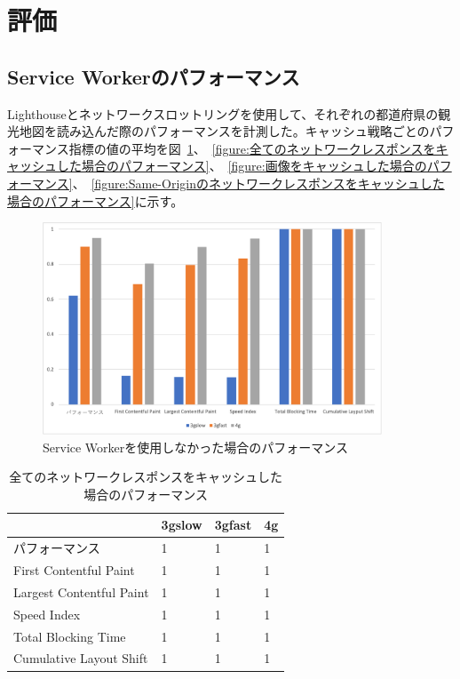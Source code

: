 \section{評価}
\label{section:評価}
\subsection{Service Workerのパフォーマンス}
\label{subsubsection:Service Workerのパフォーマンス}
Lighthouseとネットワークスロットリングを使用して、それぞれの都道府県の観光地図を読み込んだ際のパフォーマンスを計測した。キャッシュ戦略ごとのパフォーマンス指標の値の平均を図~\ref{figure:Service Workerを使用しなかった場合のパフォーマンス}、~\ref{figure:全てのネットワークレスポンスをキャッシュした場合のパフォーマンス}、~\ref{figure:画像をキャッシュした場合のパフォーマンス}、~\ref{figure:Same-Originのネットワークレスポンスをキャッシュした場合のパフォーマンス}に示す。
\begin{figure}
  \centering
  \includegraphics[width=0.9\textwidth]{images/without_service_worker.png}
  \caption{Service Workerを使用しなかった場合のパフォーマンス}\label{figure:Service Workerを使用しなかった場合のパフォーマンス}
\end{figure}
\begin{table}
  \caption{全てのネットワークレスポンスをキャッシュした場合のパフォーマンス}
  \label{table:全てのネットワークレスポンスをキャッシュした場合のパフォーマンス}
  \centering
  \begin{tabular}{|p{15em}|p{5em}|p{5em}|p{5em}|}
    \hline
    & 3gslow & 3gfast & 4g \\ \hline
    パフォーマンス & 1 & 1 & 1 \\ \hline
    First Contentful Paint & 1 & 1 & 1 \\ \hline
    Largest Contentful Paint & 1 & 1 & 1 \\ \hline
    Speed Index & 1 & 1 & 1 \\ \hline
    Total Blocking Time & 1 & 1 & 1 \\ \hline
    Cumulative Layout Shift & 1 & 1 & 1 \\ \hline
  \end{tabular}
\end{table}

